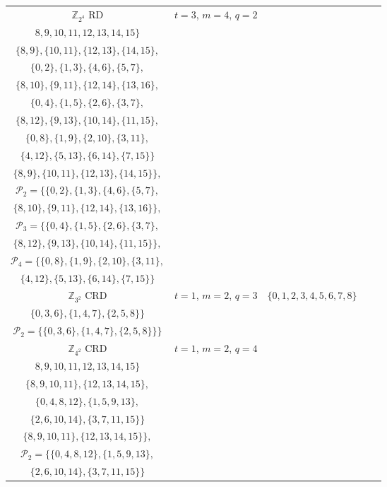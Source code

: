 \documentclass[conference]{IEEEtran}
\begin{document}
\begin{table*}[h]
\begin{center}
\begin{tabular}{|c|c|c|c|c|}
			$\mathbb{Z}_{2^4}$ RD & $t = 3$, $m = 4$, $q = 2$ & \makecell{	$\{ 0, 1, 2, 3, 4, 5, 6, 7,$\\
				$ 8, 9, 10, 11, 12, 13, 14, 15\}$} &  \makecell{$\{\{0,1\}, \{2,3\}, \{4,5\}, \{6,7 \},$\\$ \{8,9\}, \{10,11\}, \{12,13\}, \{14,15\},$\\
				$\{0,2\}, \{1,3\}, \{4,6\}, \{5,7\},$\\$ \{8,10\}, \{9,11\}, \{12,14\}, \{13,16\},$\\
				$\{0,4\}, \{1,5\}, \{2,6\}, \{3,7\},$\\$ \{8,12\}, \{9,13\}, \{10,14\}, \{11,15\},$\\
				$\{0,8\}, \{1,9\}, \{2,10\}, \{3,11\},$\\$ \{4,12\}, \{5,13\},\{6,14\}, \{7,15\}\}$}& \makecell{  $\mathcal{P}_1 = \{\{0,1\}, \{2,3\}, \{4,5\}, \{6,7 \},$\\$ \{8,9\}, \{10,11\}, \{12,13\}, \{14,15\}\},$\\
				$\mathcal{P}_2 = \{\{0,2\}, \{1,3\}, \{4,6\}, \{5,7\},$\\$ \{8,10\}, \{9,11\}, \{12,14\}, \{13,16\}\},$\\
				$\mathcal{P}_3 = \{\{0,4\}, \{1,5\}, \{2,6\}, \{3,7\},$\\$ \{8,12\}, \{9,13\}, \{10,14\}, \{11,15\}\},$\\
				$\mathcal{P}_4 = \{\{0,8\}, \{1,9\}, \{2,10\}, \{3,11\},$\\$ \{4,12\}, \{5,13\}, \{6,14\}, \{7,15\}\}$}\\
			\hline
			$\mathbb{Z}_{3^2}$ CRD & $t = 1$, $m = 2$, $q = 3$ & 	$\{ 0, 1, 2, 3, 4, 5, 6, 7, 8\}$ &  \makecell{$\{\{0, 1 ,2\},\{3, 4, 5\},\{6, 7, 8\},$\\$\{0, 3, 6\},\{1, 4, 7\},\{2, 5, 8\}\}$
			}& \makecell{$\mathcal{P}_1 = \{\{0, 1 ,2\},\{3, 4, 5\},\{6, 7, 8\}\},$\\$\mathcal{P}_2 = \{\{0, 3, 6\},\{1, 4, 7\},\{2, 5, 8\}\}\}$}\\
			\hline
			$\mathbb{Z}_{4^2}$ CRD & $t = 1$, $m = 2$, $q = 4$ & 	\makecell{$\{0, 1, 2, 3, 4, 5, 6, 7,$\\$ 8, 9, 10, 11, 12, 13, 14, 15\}$} &  \makecell{$\{\{0, 1, 2 ,3\},\{4, 5, 6, 7\},$\\$\{8, 9, 10, 11\},\{12, 13, 14, 15\},$\\
				$\{0, 4, 8, 12\},\{1, 5, 9, 13\},$\\$\{2, 6, 10, 14\},\{3, 7, 11, 15\}\}$
			}& \makecell{$\mathcal{P}_1 = \{\{0, 1, 2 ,3\},\{4, 5, 6, 7\},$\\$\{8, 9, 10, 11\},\{12, 13, 14, 15\}\},$\\$\mathcal{P}_2 = \{\{0, 4, 8, 12\},\{1, 5, 9, 13\},$\\$\{2, 6, 10, 14\},\{3, 7, 11, 15\}\}$}\\
			\hline
		\end{tabular}
	\end{center}
\label{Examples}
\end{table*}
\end{document}
